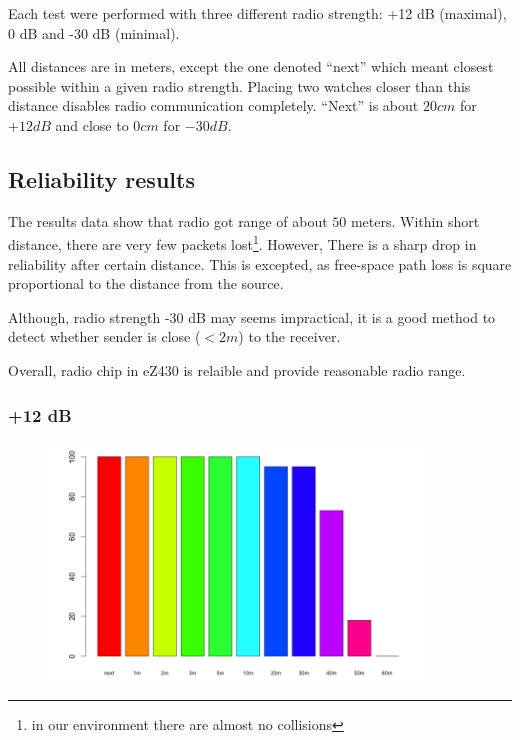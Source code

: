 Each test were performed with three different radio strength: +12 dB (maximal), 0 dB and -30 dB (minimal).

All distances are in meters, except the one denoted ``next''  which meant closest possible within a given radio strength.
Placing two watches closer than this distance disables radio communication completely.
``Next'' is about $20 cm$ for $+12 dB$ and close to $0 cm$ for $- 30 dB$.



\subsection{Reliability results}

The results data show that radio got range of about $50$ meters.
Within short distance, there are very few packets lost\footnote{in our environment there are almost no collisions}.
However, There is a sharp drop in reliability after certain distance.
This is excepted, as free-space path loss is square proportional to the distance from the source.

Although, radio strength -30 dB may seems impractical, it is a good method to detect whether sender is close ($< 2m$) to the receiver.

Overall, radio chip in eZ430 is relaible and provide reasonable radio range.


\subsubsection{+12 dB}

\begin{figure}[H]
  \centering
  \includegraphics[width=0.9\textwidth]{img/tests/range/db_12.png}
\end{figure}


